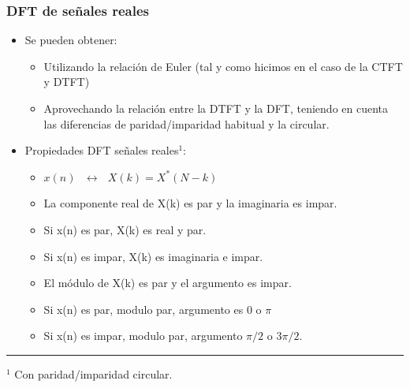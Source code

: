 
\begin{frame}
\frametitle{DFT de señales reales}


\begin{itemize}
\item Se pueden obtener:
\begin{itemize}

\item Utilizando la relación de Euler (tal y como hicimos en el caso de la CTFT y DTFT)
\item Aprovechando la relación entre la DTFT y la DFT, teniendo en cuenta las diferencias de paridad/imparidad habitual y la circular. 
\end{itemize}
\item Propiedades DFT señales reales$^1$:
\begin{itemize}

	\item $x(n) \:\:\: \leftrightarrow \:\:\:X(k)=X^*(N-k)$
	\item La componente real de X(k) es par y la imaginaria es impar.
	\item Si x(n) es par, X(k) es real y par.
	\item Si x(n) es impar, X(k) es imaginaria e impar.
	\item El módulo de X(k) es par y el argumento es impar.
	\item Si x(n) es par, modulo par, argumento es 0 o $\pi$
	\item Si x(n) es impar, modulo par, argumento $\pi/2$ o $3\pi/2$.
\end{itemize}


\end{itemize}

\rule{11cm}{0.4pt}

\footnotesize
$^1$ Con paridad/imparidad circular.

\end{frame}




